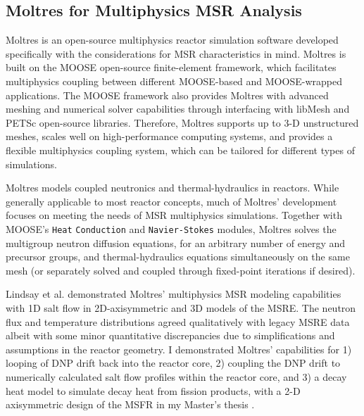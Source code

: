 \subsection{Moltres for Multiphysics \gls{MSR} Analysis}

Moltres \cite{lindsay_moltres_2017} is an open-source multiphysics reactor simulation software
developed specifically with the considerations for \gls{MSR} characteristics in mind. Moltres is
built on the \gls{MOOSE} \cite{permann_moose_2020} open-source finite-element framework,
which facilitates multiphysics coupling between different
\gls{MOOSE}-based and \gls{MOOSE}-wrapped applications. The \gls{MOOSE} framework also provides
Moltres with advanced meshing and numerical solver capabilities through interfacing with libMesh
\cite{kirk_libmesh_2006} and PETSc \cite{satish_petsc_2019} open-source libraries. Therefore,
Moltres supports up to 3-D unstructured meshes, scales well on high-performance computing systems,
and provides a flexible multiphysics coupling system, which can be tailored for different types of
simulations.

Moltres models coupled neutronics and thermal-hydraulics in reactors. While
generally applicable to most reactor concepts, much of
Moltres' development focuses on meeting the needs of \gls{MSR} multiphysics simulations.
Together with \gls{MOOSE}'s \texttt{Heat}
\texttt{Conduction} and \texttt{Navier-Stokes} \cite{peterson_overview_2018}
modules, Moltres solves the multigroup neutron diffusion
equations, for an arbitrary number of energy and precursor groups, and
thermal-hydraulics equations simultaneously on the same mesh (or separately solved and coupled
through fixed-point iterations if desired).

Lindsay et al. \cite{lindsay_introduction_2018}
demonstrated Moltres' multiphysics \gls{MSR} modeling capabilities with 1D salt
flow in 2D-axisymmetric and 3D models of the \gls{MSRE}. The neutron flux and
temperature distributions agreed qualitatively with legacy
\gls{MSRE} data albeit with some minor quantitative discrepancies due to
simplifications and assumptions in the reactor geometry. I demonstrated Moltres' capabilities for
1) looping of \gls{DNP} drift back into the reactor core, 2) coupling the \gls{DNP}
drift to numerically calculated salt flow profiles within the reactor core,
and 3) a decay heat model to simulate decay heat from fission products, with a 2-D axisymmetric
design of the \gls{MSFR} in my Master's thesis \cite{park_advancement_2020}.

